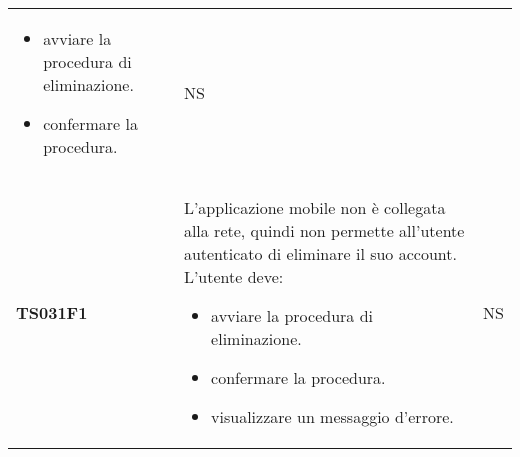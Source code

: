 \documentclass[../piano-di-qualifica.tex]{subfiles}
\begin{document}
\begin{centering}
\begin{longtable}[H]{>{\centering\bfseries}m{3cm} >{}p{10cm} >{\centering\arraybackslash}m{3cm}}
\begin{itemize}
                        \item avviare la procedura di eliminazione.
                        \item confermare la procedura.
                      \end{itemize}
                    & NS \\
        TS031F1     & L'applicazione mobile non è collegata alla rete, quindi non permette all'utente autenticato di eliminare il suo account. \newline
                      L'utente deve:
                      \begin{itemize}
                        \item avviare la procedura di eliminazione.
                        \item confermare la procedura.
                        \item visualizzare un messaggio d'errore.
                      \end{itemize}
                    & NS \\



\end{longtable}
\end{centering}
\end{document}
